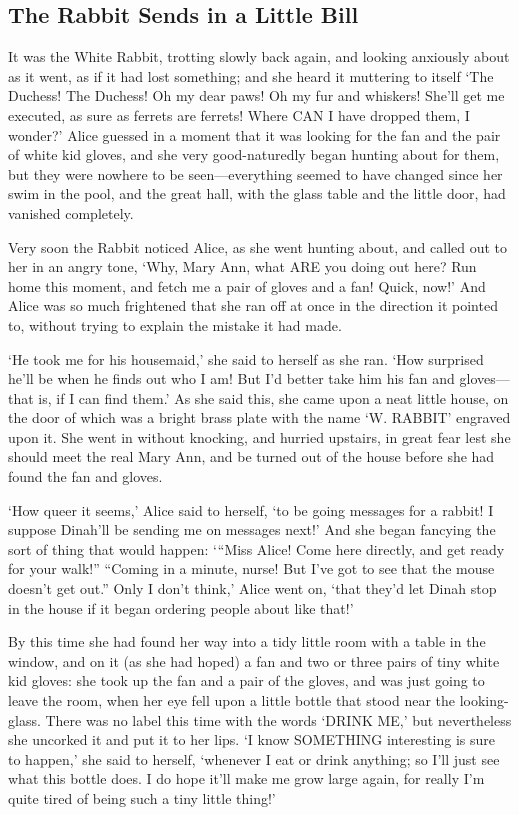 \documentclass[12pt]{article}
\begin{document}
\begin{Parallel}[p]{}{}
{\section{The Rabbit Sends in a Little Bill}

It was the White Rabbit, trotting slowly back again, and looking anxiously about as it went, as if it had lost something; and she heard it muttering to itself ‘The Duchess! The Duchess! Oh my dear paws! Oh my fur and whiskers! She’ll get me executed, as sure as ferrets are ferrets! Where CAN I have dropped them, I wonder?’ Alice guessed in a moment that it was looking for the fan and the pair of white kid gloves, and she very good-naturedly began hunting about for them, but they were nowhere to be seen—everything seemed to have changed since her swim in the pool, and the great hall, with the glass table and the little door, had vanished completely.

Very soon the Rabbit noticed Alice, as she went hunting about, and called out to her in an angry tone, ‘Why, Mary Ann, what ARE you doing out here? Run home this moment, and fetch me a pair of gloves and a fan! Quick, now!’ And Alice was so much frightened that she ran off at once in the direction it pointed to, without trying to explain the mistake it had made.

‘He took me for his housemaid,’ she said to herself as she ran. ‘How surprised he’ll be when he finds out who I am! But I’d better take him his fan and gloves—that is, if I can find them.’ As she said this, she came upon a neat little house, on the door of which was a bright brass plate with the name ‘W. RABBIT’ engraved upon it. She went in without knocking, and hurried upstairs, in great fear lest she should meet the real Mary Ann, and be turned out of the house before she had found the fan and gloves.

‘How queer it seems,’ Alice said to herself, ‘to be going messages for a rabbit! I suppose Dinah’ll be sending me on messages next!’ And she began fancying the sort of thing that would happen: ‘“Miss Alice! Come here directly, and get ready for your walk!” “Coming in a minute, nurse! But I’ve got to see that the mouse doesn’t get out.” Only I don’t think,’ Alice went on, ‘that they’d let Dinah stop in the house if it began ordering people about like that!’

By this time she had found her way into a tidy little room with a table in the window, and on it (as she had hoped) a fan and two or three pairs of tiny white kid gloves: she took up the fan and a pair of the gloves, and was just going to leave the room, when her eye fell upon a little bottle that stood near the looking-glass. There was no label this time with the words ‘DRINK ME,’ but nevertheless she uncorked it and put it to her lips. ‘I know SOMETHING interesting is sure to happen,’ she said to herself, ‘whenever I eat or drink anything; so I’ll just see what this bottle does. I do hope it’ll make me grow large again, for really I’m quite tired of being such a tiny little thing!’

}
\end{Parallel}
\end{document}
